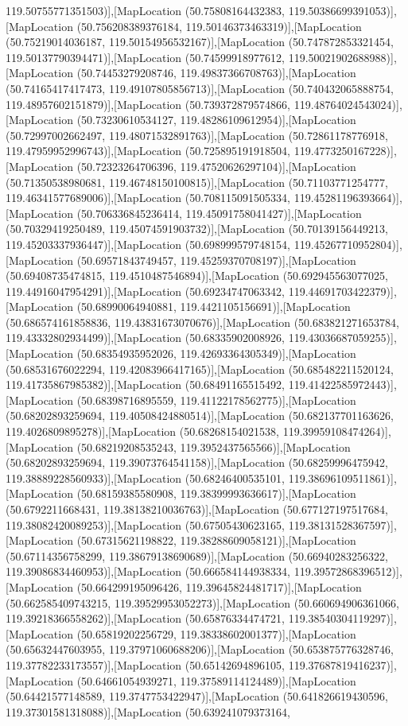 119.50755771351503)],[MapLocation (50.75808164432383, 119.50386699391053)],[MapLocation (50.756208389376184, 119.50146373463319)],[MapLocation (50.75219014036187, 119.50154956532167)],[MapLocation (50.747872853321454, 119.50137790394471)],[MapLocation (50.74599918977612, 119.50021902688988)],[MapLocation (50.74453279208746, 119.49837366708763)],[MapLocation (50.74165417417473, 119.49107805856713)],[MapLocation (50.740432065888754, 119.48957602151879)],[MapLocation (50.739372879574866, 119.48764024543024)],[MapLocation (50.73230610534127, 119.48286109612954)],[MapLocation (50.72997002662497, 119.48071532891763)],[MapLocation (50.72861178776918, 119.47959952996743)],[MapLocation (50.725895191918504, 119.4773250167228)],[MapLocation (50.72323264706396, 119.47520626297104)],[MapLocation (50.71350538980681, 119.46748150100815)],[MapLocation (50.71103771254777, 119.46341577689006)],[MapLocation (50.708115091505334, 119.45281196393664)],[MapLocation (50.706336845236414, 119.45091758041427)],[MapLocation (50.70329419250489, 119.45074591903732)],[MapLocation (50.70139156449213, 119.45203337936447)],[MapLocation (50.698999579748154, 119.45267710952804)],[MapLocation (50.69571843749457, 119.45259370708197)],[MapLocation (50.69408735474815, 119.4510487546894)],[MapLocation (50.692945563077025, 119.44916047954291)],[MapLocation (50.69234747063342, 119.44691703422379)],[MapLocation (50.68990064940881, 119.4421105156691)],[MapLocation (50.686574161858836, 119.43831673070676)],[MapLocation (50.683821271653784, 119.43332802934499)],[MapLocation (50.68335902008926, 119.43036687059255)],[MapLocation (50.68354935952026, 119.42693364305349)],[MapLocation (50.68531676022294, 119.42083966417165)],[MapLocation (50.685482211520124, 119.41735867985382)],[MapLocation (50.68491165515492, 119.41422585972443)],[MapLocation (50.68398716895559, 119.41122178562775)],[MapLocation (50.68202893259694, 119.40508424880514)],[MapLocation (50.682137701163626, 119.4026809895278)],[MapLocation (50.68268154021538, 119.39959108474264)],[MapLocation (50.68219208535243, 119.3952437565566)],[MapLocation (50.68202893259694, 119.39073764541158)],[MapLocation (50.68259996475942, 119.38889228560933)],[MapLocation (50.68246400535101, 119.38696109511861)],[MapLocation (50.68159385580908, 119.38399993636617)],[MapLocation (50.6792211668431, 119.38138210036763)],[MapLocation (50.677127197517684, 119.38082420089253)],[MapLocation (50.67505430623165, 119.38131528367597)],[MapLocation (50.67315621198822, 119.38288609058121)],[MapLocation (50.67114356758299, 119.38679138690689)],[MapLocation (50.66940283256322, 119.39086834460953)],[MapLocation (50.666584144938334, 119.39572868396512)],[MapLocation (50.664299195096426, 119.39645824481717)],[MapLocation (50.662585409743215, 119.39529953052273)],[MapLocation (50.660694906361066, 119.39218366558262)],[MapLocation (50.65876334474721, 119.38540304119297)],[MapLocation (50.65819202256729, 119.38338602001377)],[MapLocation (50.65632447603955, 119.37971060688206)],[MapLocation (50.653875776328746, 119.37782233173557)],[MapLocation (50.65142694896105, 119.37687819416237)],[MapLocation (50.64661054939271, 119.37589114124489)],[MapLocation (50.64421577148589, 119.3747753422947)],[MapLocation (50.641826619430596, 119.37301581318088)],[MapLocation (50.639241079373164, 